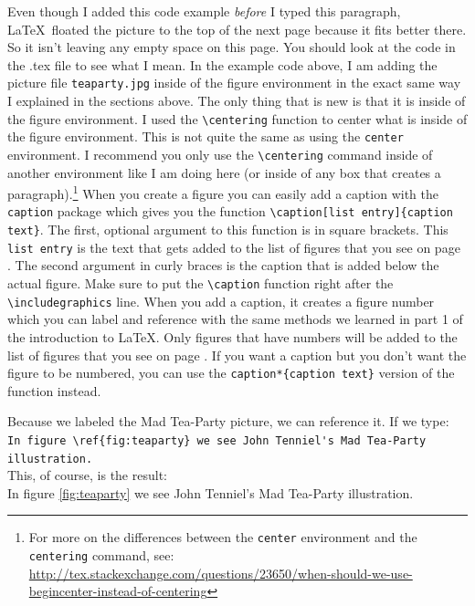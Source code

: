 \documentclass{article}
\newcommand{\nid}{\noindent} %
\begin{document}
Even though I added this code example \textit{before} I typed this paragraph, \LaTeX\ floated the picture to the top of the next page because it fits better there.  So it isn't leaving any empty space on this page.  You should look at the code in the .tex file to see what I mean.  In the example code above, I am adding the picture file \texttt{teaparty.jpg} inside of the figure environment in the exact same way I explained in the sections above.  The only thing that is new is that it is inside of the figure environment.  I used the \verb|\centering| function to center what is inside of the figure environment.  This is not quite the same as using the \texttt{center} environment.  I recommend you only use the \verb|\centering| command inside of another environment like I am doing here (or inside of any box that creates a paragraph).\footnote{For more on the differences between the \texttt{center} environment and the \texttt{centering} command, see:\\
\url{http://tex.stackexchange.com/questions/23650/when-should-we-use-begincenter-instead-of-centering}} When you create a figure you can easily add a caption with the \texttt{caption} package which gives you the function \verb|\caption[list entry]{caption text}|.  The first, optional argument to this function is in square brackets.  This \verb|list entry| is the text that gets added to the list of figures that you see on page \pageref{listoffigures}.  The second argument in curly braces is the caption that is added below the actual figure.  Make sure to put the \verb|\caption| function right after the \verb|\includegraphics| line.  When you add a caption, it creates a figure number which you can label and reference with the same methods we learned in part 1 of the introduction to \LaTeX.  Only figures that have numbers will be added to the list of figures that you see on page \pageref{listoffigures}.  If you want a caption but you don't want the figure to be numbered, you can use the \verb|caption*{caption text}| version of the function instead.

Because we labeled the Mad Tea-Party picture, we can reference it.  If we type:\\

\nid\verb|In figure \ref{fig:teaparty} we see John Tenniel's Mad Tea-Party illustration.|\\

\nid This, of course, is the result:\\

\nid In figure \ref{fig:teaparty} we see John Tenniel's Mad Tea-Party illustration.\\
\end{document}
